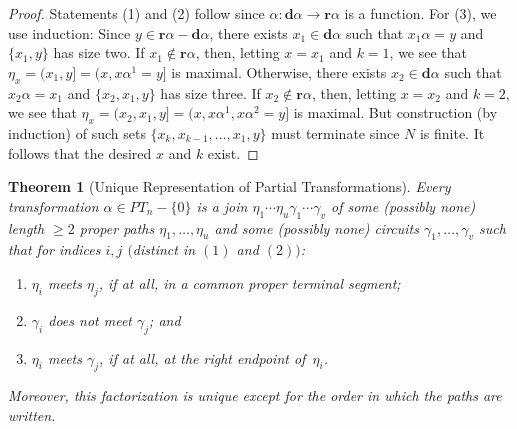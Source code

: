 \documentclass{surv-l}
\numberwithin{equation}{section}
\numberwithin{table}{section}
\numberwithin{figure}{section}
\newtheorem{theorem}[equation]{Theorem}
\theoremstyle{definition}
\begin{document}
\begin{proof} Statements (1) and (2) follow since $\alpha :
\mathbf{d}\alpha\rightarrow \mathbf{r}\alpha$ is a function. For
(3), we use induction: Since $y\in
\mathbf{r}\alpha-\mathbf{d}\alpha$, there exists $x_{1}\in
\mathbf{d}\alpha$ such that $x_{1}\alpha=y$ and $\{x_{1}, y\}$ has
size two. If $x_{1}\not\in \mathbf{r}\alpha$, then, letting
$x=x_{1}$ and $k=1$, we see that $\eta_{x}=(x_{1}, y]=(x,
x\alpha^{1}=y]$ is maximal. Otherwise, there exists $ x_{2}\in
\mathbf{d}\alpha$ such that $x_{2}\alpha=x_{1}$ and $\{x_{2},
x_{1},y\}$ has size three. If $ x_{2}\not\in \mathbf{r}\alpha$,
then, letting $x=x_{2}$ and $k=2$, we see that $\eta_{x}=(x_{2},
x_{1}, y]=(x, x\alpha^{1}, x\alpha^{2}=y]$ is maximal. But
construction (by induction) of such sets $\{x_{k}, x_{k-1},\ldots,
x_{1}, y\}$ must terminate since $N$ is finite. It follows that
the desired $x$ and $k$ exist.
\end{proof}

\begin{theorem}[Unique Representation of Partial Transformations]\label{thm11.51.3}
Every transformation $\alpha\in PT_{n}-\{0\}$ is a join
$\eta_{1}\cdots\eta_{u}\gamma_{1}\cdots\gamma_{v}$ of some
(possibly none) length $\geq 2$ proper paths $\eta_{1},\ldots,
\eta_{u}$ and some (possibly none) circuits $\gamma_{1},\ldots,
\gamma_{v}$ such that for indices $i,j$ $($distinct in $(1)$ and $(2))$:
\begin{enumerate}
\item[(1)] $\eta_{i}$ meets $\eta_{j}$, if at all, in a
common proper terminal segment;

\item[(2)] $\gamma_{i}$ does not meet $\gamma_{j}$; and

\item[(3)] $\eta_{i}$ meets $\gamma_{j}$, if at all, at the
right endpoint of~$\eta_{i}$.
\end{enumerate}
Moreover, this factorization is unique except for the order in
which the paths are written.
\end{theorem}
\end{document}
